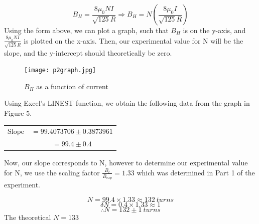 \documentclass[letterpaper]{article}
\begin{document}
$$ B_H = \frac{8\mu_0NI}{\sqrt{125}R} \Rightarrow B_H = N\left( \frac{8\mu_0I}{\sqrt{125}R} \right)  $$
Using the form above, we can plot a graph, such that
$B_H$ is on the y-axis, and $\frac{8\mu_0NI}{\sqrt{125}R}$ is plotted on the x-axis.
Then, our experimental value for N will be the slope, and the y-intercept should theoretically be zero.
\begin{figure}[H]
 \centering
 \texttt{[image: p2graph.jpg]}
 \caption{$B_H$ as a function of current}
\end{figure}

\newpage
\noindent Using Excel's LINEST function, we obtain the following data from the graph in Figure 5.
\begin{table}[H]
 \centering
 \begin{tabular}{cc}
  Slope & $=99.4073706 \pm 0.3873961 $ \\
        & $=99.4 \pm 0.4$
 \end{tabular}
\end{table}

Now, our slope corresponds to N, however to determine our experimental
value for N, we use the scaling factor $\frac{B_t}{B_{exp}}=1.33$ which was
determined in Part 1 of the experiment.

$$ N= 99.4 \times 1.33 \approx 132 \:turns $$
$$ \delta N   = 0.4 \times 1.33 \approx 1 $$
$$ \therefore N = 132 \pm 1 \:turns$$
The theoretical $N=133$

\end{document}
